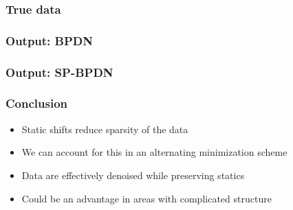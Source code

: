 \begin{frame} \frametitle{True data}
\end{frame}
\begin{frame} \frametitle{Output: BPDN}
\end{frame}
\begin{frame} \frametitle{Output: SP-BPDN}
\end{frame}


\begin{frame} \frametitle{Conclusion}
    \begin{itemize}
        \item Static shifts reduce sparsity of the data
        \item We can account for this in an alternating minimization scheme
        \item Data are effectively denoised while preserving statics  
        \item Could be an advantage in areas with complicated structure
    \end{itemize}
\end{frame}


